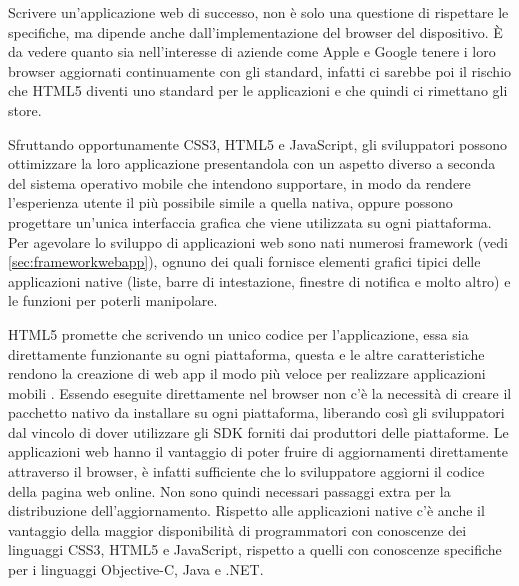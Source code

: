         Scrivere un'applicazione web di successo, non è solo una questione di
        rispettare le specifiche, ma dipende anche dall'implementazione del
        browser del dispositivo. È da vedere quanto sia nell'interesse di
        aziende come Apple e Google tenere i loro browser aggiornati
        continuamente con gli standard, infatti ci sarebbe poi il rischio che
        HTML5 diventi uno standard per le applicazioni e che quindi ci rimettano
        gli store\citep{White:Native-vs-Html}.

        Sfruttando opportunamente CSS3, HTML5 e JavaScript, gli sviluppatori
        possono ottimizzare la loro applicazione presentandola con un aspetto
        diverso a seconda del sistema operativo mobile che intendono supportare,
        in modo da rendere l'esperienza utente il più possibile simile a quella
        nativa, oppure possono progettare un'unica interfaccia grafica che viene
        utilizzata su ogni piattaforma. Per agevolare lo sviluppo di
        applicazioni web sono nati numerosi framework
        (vedi \ref{sec:frameworkwebapp}), ognuno dei quali
        fornisce elementi grafici tipici delle applicazioni native
        (liste, barre di intestazione, finestre di notifica e molto altro) e le
        funzioni \js{} per poterli manipolare.

        HTML5 promette che scrivendo un unico codice per l'applicazione,
        essa sia direttamente funzionante su ogni piattaforma, questa e le
        altre caratteristiche rendono la creazione di web app il modo più veloce
        per realizzare applicazioni mobili  \crossplat{}. Essendo eseguite
        direttamente nel browser non c'è la necessità di creare il pacchetto
        nativo da installare su ogni piattaforma, liberando così gli
        sviluppatori dal vincolo di dover utilizzare gli SDK forniti dai
        produttori delle piattaforme.
        Le applicazioni web hanno il vantaggio di poter fruire di aggiornamenti
        direttamente attraverso il browser, è infatti sufficiente che lo
        sviluppatore aggiorni il codice della pagina web online. Non sono quindi
        necessari passaggi extra per la distribuzione dell'aggiornamento.
        Rispetto alle applicazioni native c'è anche il vantaggio della maggior
        disponibilità di programmatori con conoscenze dei linguaggi CSS3, HTML5
        e JavaScript, rispetto a quelli con conoscenze specifiche per i
        linguaggi Objective-C, Java e .NET.

